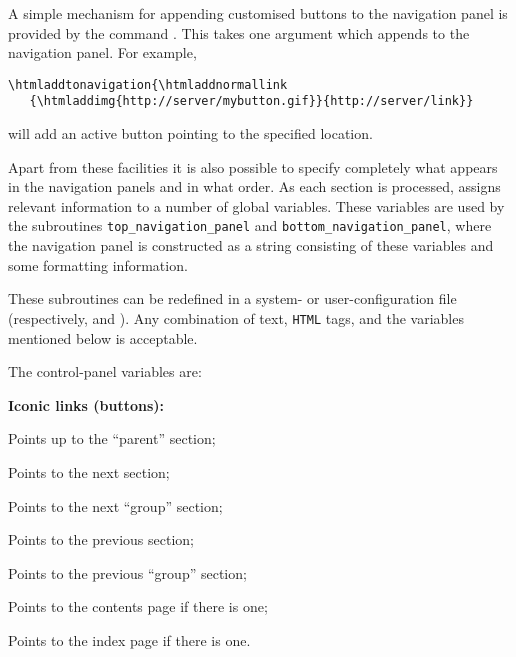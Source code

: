%
\html{\\}%
A simple mechanism for appending customised buttons to the navigation
panel is provided by the command . 
This takes one argument which \latextohtml{} appends to the navigation panel. 
For example,
\begin{small}
\begin{verbatim}
\htmladdtonavigation{\htmladdnormallink
   {\htmladdimg{http://server/mybutton.gif}}{http://server/link}}
\end{verbatim}
\end{small}
will add an active button  pointing to the specified location.

\html{\\}\noindent
Apart from these facilities it is also 
possible to specify completely what appears in the navigation panels
and in what order. As each section is processed, \latextohtml{}
assigns relevant information to a number of global variables.
These variables are used by the
subroutines \texttt{top\_navigation\_panel} and
\texttt{bottom\_navigation\_panel},
where the navigation panel is constructed as a string consisting of
these variables and some formatting information. 

\html{\\}\noindent
These subroutines can be redefined in a system- 
or user-configuration file (respectively, 
 and ). 
Any combination of text, \texttt{HTML} tags, 
and the variables mentioned below is acceptable.

\medskip\noindent
The control-panel variables are:\nobreak

\medskip\nobreak
{}%
\html{\\}
\noindent
\textbf{Iconic links (buttons):}
\begin{htmllist}\addtolength{\leftskip}{15pt}%
\item [\fn{\$UP}]  Points up to the ``parent'' section;
\item [\fn{\$NEXT}] Points to the next section;
\item [\fn{\$NEXT\_GROUP}] Points to the next ``group'' section;
\item [\fn{\$PREVIOUS}] Points to the previous section;
\item [\fn{\$PREVIOUS\_GROUP}] Points to the previous ``group'' section;
\item [\fn{\$CONTENTS}] Points to the contents page if there is one;
\item [\fn{\$INDEX}] Points to the index page if there is one.
\end{htmllist}

